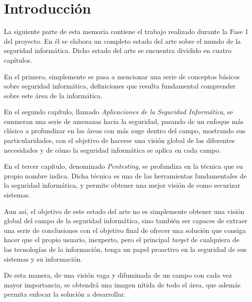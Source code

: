 \chapter{Introducción}

La siguiente parte de esta memoria contiene el trabajo realizado durante la Fase 1 del proyecto. En él se elabora un completo estado del arte sobre el mundo de la seguridad informática. Dicho estado del arte se encuentra dividido en cuatro capítulos.

En el primero, simplemente se pasa a mencionar una serie de conceptos básicos sobre seguridad informática, definiciones que resulta fundamental comprender sobre este área de la informática.

En el segundo capítulo, llamado \textit{Aplicaciones de la Seguridad Informática}, se enumeran una serie de amenazas hacia la seguridad, pasando de un enfoque más clásico a profundizar en las áreas con más auge dentro del campo, mostrando sus particularidades, con el objetivo de hacerse una visión global de las diferentes necesidades y de cómo la seguridad informática se aplica en cada campo.

En el tercer capítulo, denominado \textit{Pentesting}, se profundiza en la técnica que su propio nombre indica. Dicha técnica es una de las herramientas fundamentales de la seguridad informática, y permite obtener una mejor visión de como securizar sistemas.

Aun así, el objetivo de este estado del arte no es simplemente obtener una visión global del campo de la seguridad informática, sino también ser capaces de extraer una serie de conclusiones con el objetivo final de ofrecer una solución que consiga hacer que el propio usuario, inexperto, pero el principal \textit{target} de cualquiera de las tecnologías de la información, tenga un papel proactivo en la seguridad de sus sistemas y su información.

De esta manera, de una visión vaga y difuminada de un campo con cada vez mayor importancia, se obtendrá una imagen nítida de todo el área, que además permita enfocar la solución a desarrollar.